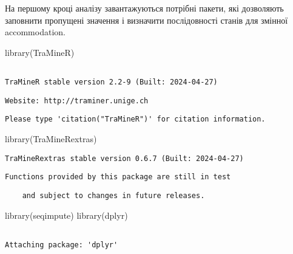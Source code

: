 \documentclass[
  letterpaper,
  DIV=11,
  numbers=noendperiod]{scrreprt}
\newenvironment{Shaded}{\begin{snugshade}}{\end{snugshade}}
\newcommand{\FunctionTok}[1]{\textcolor[rgb]{0.28,0.35,0.67}{#1}}
\newcommand{\NormalTok}[1]{\textcolor[rgb]{0.00,0.23,0.31}{#1}}
\begin{document}
На першому кроці аналізу завантажуються потрібні пакети, які дозволяють
заповнити пропущені значення і визначити послідовності станів для
змінної accommodation.

\begin{Shaded}
\begin{Highlighting}[]
\FunctionTok{library}\NormalTok{(TraMineR)}
\end{Highlighting}
\end{Shaded}

\begin{verbatim}

TraMineR stable version 2.2-9 (Built: 2024-04-27)
\end{verbatim}

\begin{verbatim}
Website: http://traminer.unige.ch
\end{verbatim}

\begin{verbatim}
Please type 'citation("TraMineR")' for citation information.
\end{verbatim}

\begin{Shaded}
\begin{Highlighting}[]
\FunctionTok{library}\NormalTok{(TraMineRextras)}
\end{Highlighting}
\end{Shaded}

\begin{verbatim}
TraMineRextras stable version 0.6.7 (Built: 2024-04-27)
\end{verbatim}

\begin{verbatim}
Functions provided by this package are still in test
\end{verbatim}

\begin{verbatim}
    and subject to changes in future releases.
\end{verbatim}

\begin{Shaded}
\begin{Highlighting}[]
\FunctionTok{library}\NormalTok{(seqimpute)}
\FunctionTok{library}\NormalTok{(dplyr)}
\end{Highlighting}
\end{Shaded}

\begin{verbatim}

Attaching package: 'dplyr'
\end{verbatim}
\end{document}

